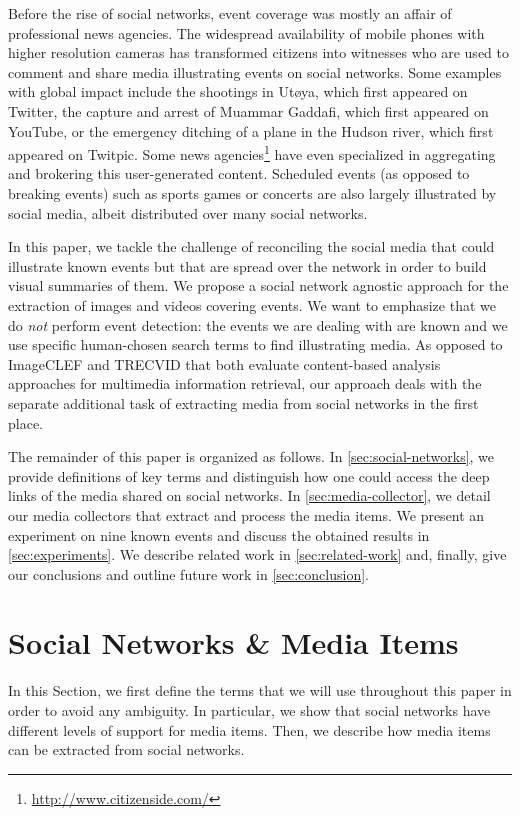 Before the rise of social networks, event coverage was mostly an affair of professional news agencies.
The widespread availability of mobile phones with higher resolution cameras has transformed citizens into witnesses
who are used to comment and share media illustrating events on social networks. Some examples with global impact
include the shootings in Ut{\o}ya, which first appeared on Twitter, the capture and arrest of Muammar Gaddafi, which
first appeared on YouTube, or the emergency ditching of a plane in the Hudson river, which first appeared on Twitpic.
Some news agencies\footnote{\url{http://www.citizenside.com/}} have even specialized in aggregating and brokering
this user-generated content. Scheduled events (as opposed to breaking events) such as sports games or concerts are also
largely illustrated by social media, albeit distributed over many social networks.

In this paper, we tackle the challenge of reconciling the social media that could illustrate known events but that
are spread over the network in order to build visual summaries of them. We propose a social network agnostic
approach for the extraction of images and videos covering events. We want to emphasize that we do \emph{not} perform
event detection: the events we are dealing with are known and we use specific human-chosen search terms to find illustrating
media. As opposed to \mbox{ImageCLEF} and \mbox{TRECVID} that both evaluate content-based analysis approaches for
multimedia information retrieval, our approach deals with the separate additional task of extracting media from social networks
in the first place.

The remainder of this paper is organized as follows. In \autoref{sec:social-networks}, we provide definitions of key terms
and distinguish how one could access the deep links of the media shared on social networks. In \autoref{sec:media-collector},
we detail our media collectors that extract and process the media items. We present an experiment on nine known events and
discuss the obtained results in \autoref{sec:experiments}. We describe related work in \autoref{sec:related-work} and,
finally, give our conclusions and outline future work in \autoref{sec:conclusion}.


\section{Social Networks \& Media Items}                                    \label{sec:social-networks}
In this Section, we first define the terms that we will use throughout this paper in order to avoid any ambiguity. In particular, we show that social networks have different levels of support for media items. Then, we describe how media items can be extracted from social networks.

